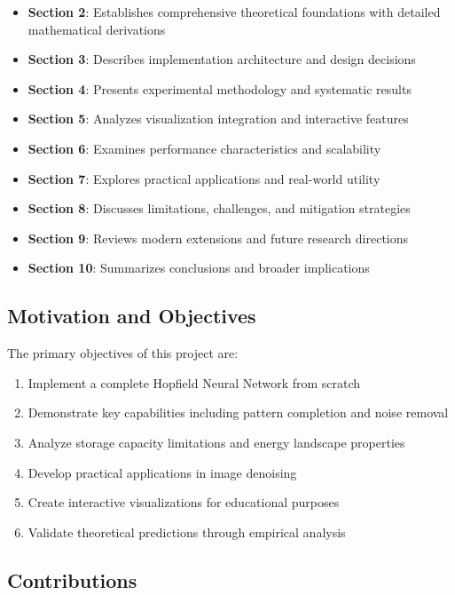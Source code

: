\documentclass[11pt,a4paper]{article}
\begin{document}
\begin{itemize}
    \item \textbf{Section 2}: Establishes comprehensive theoretical foundations with detailed mathematical derivations
    \item \textbf{Section 3}: Describes implementation architecture and design decisions
    \item \textbf{Section 4}: Presents experimental methodology and systematic results
    \item \textbf{Section 5}: Analyzes visualization integration and interactive features
    \item \textbf{Section 6}: Examines performance characteristics and scalability
    \item \textbf{Section 7}: Explores practical applications and real-world utility
    \item \textbf{Section 8}: Discusses limitations, challenges, and mitigation strategies
    \item \textbf{Section 9}: Reviews modern extensions and future research directions
    \item \textbf{Section 10}: Summarizes conclusions and broader implications
\end{itemize}

\subsection{Motivation and Objectives}

The primary objectives of this project are:
\begin{enumerate}
    \item Implement a complete Hopfield Neural Network from scratch
    \item Demonstrate key capabilities including pattern completion and noise removal
    \item Analyze storage capacity limitations and energy landscape properties
    \item Develop practical applications in image denoising
    \item Create interactive visualizations for educational purposes
    \item Validate theoretical predictions through empirical analysis
\end{enumerate}

\subsection{Contributions}
\end{document}
